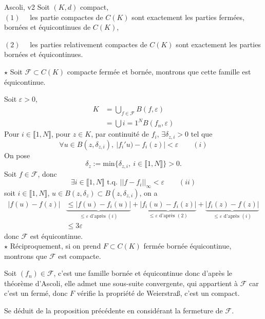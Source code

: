 \documentclass[a4paper,11pt, twoside]{article}
\begin{document}
\begin{thC}{Ascoli, v2}
  Soit $(K,d)$ compact,\\

  $(\mathit 1)\quad$ les partie compactes de $C(K)$ sont exactement les parties fermées, bornées et équicontinues de $C(K)$,

  $(\mathit 2)\quad$ les parties relativement compactes de $C(K)$ sont exactement les parties bornées et équicontinues.
\end{thC}


\begin{Proof}
  $\star$ Soit $\mathcal F\subset C(K)$ compacte fermée et bornée, montrons que cette famille est équicontinue. 
  
  Soit $\varepsilon>0$,
  \begin{align*}
    K&=\bigcup_{f\in\mathcal F}B(f,\varepsilon)\\
    &=\bigcup{i=1}^NB(f_n,\varepsilon)
  \end{align*}
  Pour $i\in\llbracket 1,N\rrbracket$, pour $z\in K$, par continuité de $f_i$, $\exists \delta_{z,i}>0$ tel que 
  $$\forall u \in B(z,\delta_{z,i}),\ \left|f_i'u)-f_i(z)\right|<\varepsilon\qquad (i)$$
  On pose 
  $$\delta_z:=\mathrm{min}\{\delta_{z,i},\ i\in\llbracket 1,N\rrbracket\}>0.$$
  Soit $f\in\mathcal F$, donc 
  $$\exists i\in \llbracket 1,N\rrbracket\text{ t.q. }||f-f_i||_{\infty}<\varepsilon\qquad (ii)$$
  soit $i\in \llbracket 1,N\rrbracket$, $u\in B(z,\delta_z)\subset B(z,\delta_{z,i})$, on a 
  \begin{align*}
    |f(u)-f(z)|&\underbrace{\leqslant|f(u)-f_i(u)|}_{\leqslant\varepsilon\text{ d'après }(i)}+\underbrace{|f_i(u)-f_i(z)|}_{\leqslant\varepsilon\text{ d'après }(2)}+\underbrace{|f_i(z)-f(z)|}_{\leqslant\varepsilon\text{ d'après }(i)}\\
  &\leqslant 3\varepsilon
  \end{align*}
  donc $\mathcal  F$ est équicontinue.\\

  $\star$ Réciproquement, si on prend $F\subset C(K)$ fermée bornée équicontinue, montrons que $\mathcal F$ est compacte.
  
  Soit $(f_n)\in \mathcal F$, c'est une famille bornée et équicontinue donc d'après le théorème d'Ascoli, elle admet une sous-suite convergente, qui appartient à $\mathcal F$ car c'est un fermé, donc $F$ vérifie la propriété de Weierstra\ss, c'est un compact.
\end{Proof}


\begin{Proof}
  Se déduit de la proposition précédente en considérant la fermeture de $\mathcal F$.
\end{Proof}
\end{document}
